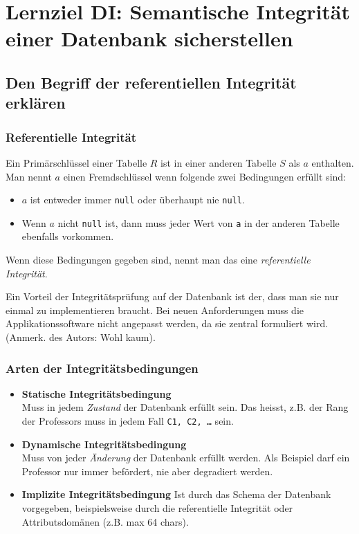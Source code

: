 \section{Lernziel DI: Semantische Integrität einer Datenbank sicherstellen}

\subsection{Den Begriff der referentiellen Integrität erklären}

\subsubsection{Referentielle Integrität}
Ein Primärschlüssel einer Tabelle \(R\) ist in einer anderen Tabelle \(S\) als \(a\) enthalten. Man nennt \(a\) einen Fremdschlüssel wenn folgende zwei Bedingungen erfüllt sind:

\begin{itemize}
  \item \(a\) ist entweder immer \texttt{null} oder überhaupt nie \texttt{null}.
  \item Wenn \(a\) nicht \texttt{null} ist, dann muss jeder Wert von \texttt{a} in der anderen Tabelle ebenfalls vorkommen.
\end{itemize}

Wenn diese Bedingungen gegeben sind, nennt man das eine \emph{referentielle Integrität}. 

Ein Vorteil der Integritätsprüfung auf der Datenbank ist der, dass man sie nur einmal zu implementieren braucht. Bei neuen Anforderungen muss die Applikationssoftware nicht angepasst werden, da sie zentral formuliert wird. (Anmerk. des Autors: Wohl kaum).

\subsubsection{Arten der Integritätsbedingungen}
\begin{itemize}
    \item \textbf{Statische Integritätsbedingung} \\
    Muss in jedem \emph{Zustand} der Datenbank erfüllt sein. Das heisst, z.B. der Rang der Professors muss in jedem Fall \texttt{C1, C2, \dots } sein.
    \item \textbf{Dynamische Integritätsbedingung} \\
    Muss von jeder \emph{Änderung} der Datenbank erfüllt werden. Als Beispiel darf ein Professor nur immer befördert, nie aber degradiert werden.
    \item \textbf{Implizite Integritätsbedingung}
    Ist durch das Schema der Datenbank vorgegeben, beispielsweise durch die referentielle Integrität oder Attributsdomänen (z.B. max 64 chars).
\end{itemize}

